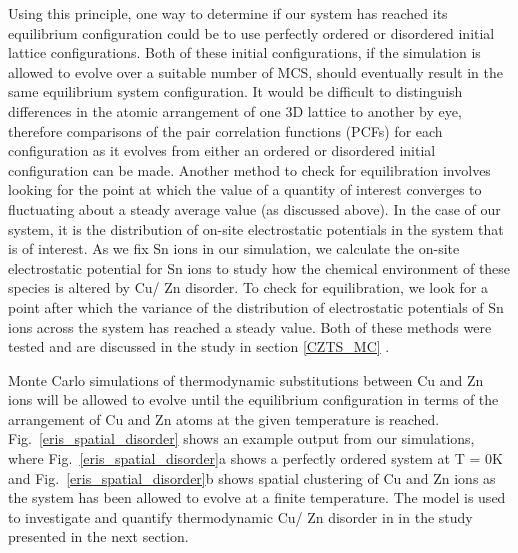\documentclass[11pt, twoside]{report}
\begin{document}
Using this principle, one way to determine if our system has reached its equilibrium configuration could be to use perfectly ordered or disordered initial lattice configurations. Both of these initial configurations, if the simulation is allowed to evolve over a suitable number of MCS, should eventually result in the same equilibrium system configuration. It would be difficult to distinguish differences in the atomic arrangement of one 3D lattice to another by eye, therefore comparisons of the pair correlation functions (PCFs) for each configuration as it evolves from either an ordered or disordered initial configuration can be made. 
Another method to check for equilibration involves looking for the point at which the value of a quantity of interest converges to fluctuating about a steady average value (as discussed above). In the case of our system, it is the distribution of on-site electrostatic potentials in the system that is of interest. As we fix Sn ions in our simulation, we calculate the on-site electrostatic potential for Sn ions to study how the chemical environment of these species is altered by Cu/ Zn disorder. To check for equilibration, we look for a point after which the variance of the distribution of electrostatic potentials of Sn ions across the system has reached a steady value. Both of these methods were tested and are discussed in the study in section \ref{CZTS_MC} \cite{eris_paper}.

Monte Carlo simulations of thermodynamic substitutions between Cu and Zn ions will be allowed to evolve until the equilibrium configuration in terms of the arrangement of Cu and Zn atoms at the given temperature is reached. Fig.~\ref{eris_spatial_disorder} shows an example output from our simulations, where Fig.~\ref{eris_spatial_disorder}a shows a perfectly ordered system at T = 0K and Fig.~\ref{eris_spatial_disorder}b shows spatial clustering of Cu and Zn ions as the system has been allowed to evolve at a finite temperature. The model is used to investigate and quantify thermodynamic Cu/ Zn disorder in {\CZTS} in the study presented in the next section. 
\end{document}
